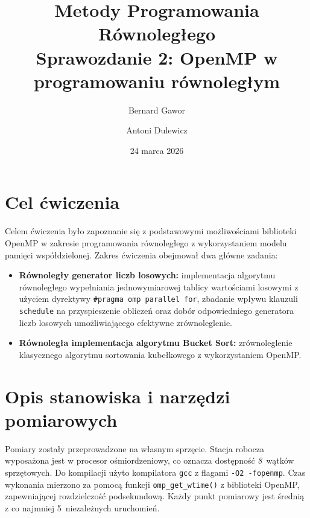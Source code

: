 \documentclass[12pt, a4paper]{article}
\title{
  \vspace{1cm}
  {\LARGE\textbf{Metody Programowania Równoległego}}\\[0.5cm]
  {\large Sprawozdanie 2: OpenMP w programowaniu równoległym}\\[1.5cm]
}
\author{Bernard Gawor \and Antoni Dulewicz}
\date{24 marca 2026}
\begin{document}
\maketitle
\thispagestyle{empty}
\vfill

\newpage
\tableofcontents
\newpage

\section{Cel ćwiczenia}

Celem ćwiczenia było zapoznanie się z podstawowymi możliwościami biblioteki OpenMP
w zakresie programowania równoległego z wykorzystaniem modelu pamięci współdzielonej.
Zakres ćwiczenia obejmował dwa główne zadania:

\begin{itemize}
  \item \textbf{Równoległy generator liczb losowych:} implementacja algorytmu
        równoległego wypełniania jednowymiarowej tablicy wartościami losowymi
        z użyciem dyrektywy \texttt{\#pragma omp parallel for}, zbadanie wpływu
        klauzuli \texttt{schedule} na przyspieszenie obliczeń oraz dobór
        odpowiedniego generatora liczb losowych umożliwiającego efektywne
        zrównoleglenie.
  \item \textbf{Równoległa implementacja algorytmu Bucket Sort:} zrównoleglenie
        klasycznego algorytmu sortowania kubełkowego z wykorzystaniem OpenMP.
\end{itemize}

\section{Opis stanowiska i narzędzi pomiarowych}

Pomiary zostały przeprowadzone na własnym sprzęcie. Stacja robocza wyposażona jest
w procesor ośmiordzeniowy, co oznacza dostępność \textit{8}~wątków sprzętowych.
Do kompilacji użyto kompilatora \texttt{gcc} z flagami \texttt{-O2 -fopenmp}.
Czas wykonania mierzono za pomocą funkcji \texttt{omp\_get\_wtime()} z biblioteki OpenMP,
zapewniającej rozdzielczość podsekundową. Każdy punkt pomiarowy jest średnią
z co najmniej 5~niezależnych uruchomień.

\end{document}
